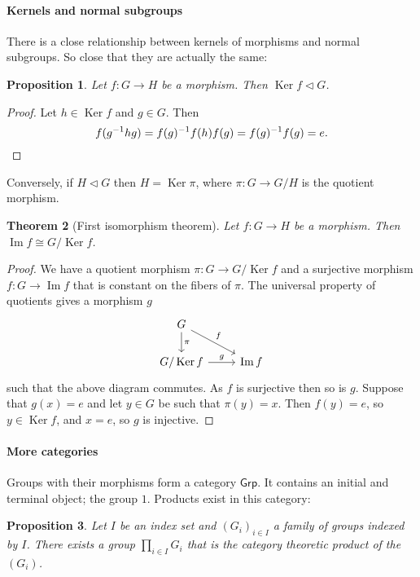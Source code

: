 \documentclass[11pt]{article}
\newtheorem{theo}{Theorem}
\newtheorem{prop}[theo]{Proposition}
\theoremstyle{definition}
\def\grp{\mathsf{Grp}}
\DeclareMathOperator{\ke}{Ker}
\DeclareMathOperator{\im}{Im}
\begin{document}
\paragraph{Kernels and normal subgroups}

There is a close relationship between kernels of morphisms and normal subgroups.
So close that they are actually the same:

\begin{prop}
Let $f : G \to H$ be a morphism.
Then $\ke f \triangleleft G$.
\end{prop}

\begin{proof}
Let $h \in \ke f$ and $g \in G$. Then
\begin{equation*}
f(g^{-1} h g)
= f(g)^{-1} f(h) f(g)
= f(g)^{-1} f(g)
= e.
\qedhere
\end{equation*}
\end{proof}

Conversely, if $H \triangleleft G$ then $H = \ke \pi$, where $\pi : G \to G/H$
is the quotient morphism.


\begin{theo}[First isomorphism theorem]
Let $f : G \to H$ be a morphism.
Then $\im f \cong G / \ke f$.
\end{theo}

\begin{proof}
We have a quotient morphism $\pi : G \to G / \ke f$ and a surjective morphism
$f : G \to \im f$ that is constant on the fibers of $\pi$.
The universal property of quotients gives a morphism $g$
$$
\begin{tikzcd}
G \ar[d,"\pi"] \ar[dr,"f"] & 
\\
G/\ke f \ar[r,"g"] & \im f
\end{tikzcd}
$$
such that the above diagram commutes.
As $f$ is surjective then so is $g$.
Suppose that $g(x) = e$ and let $y \in G$ be such that $\pi(y) = x$.
Then $f(y) = e$, so $y \in \ke f$, and $x = e$, so $g$ is injective.
\end{proof}




\paragraph{More categories}

Groups with their morphisms form a category $\grp$.
It contains an initial and terminal object; the group $1$.
Products exist in this category:

\begin{prop}
Let $I$ be an index set and $(G_i)_{i \in I}$ a family of groups indexed by $I$.
There exists a group $\prod_{i \in I}G_i$ that is the category theoretic
product of the $(G_i)$.
\end{prop}
\end{document}
